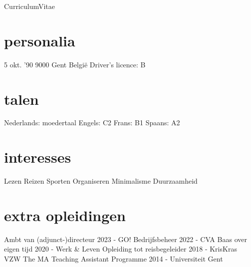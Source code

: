 \documentclass[]{friggeri-cv}
\begin{document}
       {}{Curriculum}{Vitae}
 \begin{aside}
  \vspace{-0.8cm}\section{personalia}
    5 okt. '90
    9000 Gent
    Belgi\"e\vspace{0.21cm}
    \vspace{0.21cm}
    Driver's licence: B \vspace{-1.25mm}
  \section{talen} 	
    Nederlands: moedertaal
    Engels: C2
    Frans:  B1  
    Spaans: A2\vspace{3.3mm}
  \section{interesses}
  Lezen
  Reizen
  Sporten
  Organiseren
  Minimalisme
  Duurzaamheid\vspace{3.3mm}
  \section{extra opleidingen}
  Ambt van (adjunct-)directeur
  {\footnotesize{}2023 - GO!} \vspace{0.25cm}
  Bedrijfsbeheer
  {\footnotesize{}2022 - CVA} \vspace{0.25cm}
  Baas over eigen tijd
  {\footnotesize{}2020 - Werk \& Leven} \vspace{0.25cm}
  Opleiding tot reisbegeleider
  {\footnotesize{}2018 - KrisKras VZW} \vspace{0.25cm}
  The MA Teaching Assistant Programme
  {\footnotesize{}2014 - Universiteit Gent} \vspace{3.3mm}
\end{aside}
\vspace{-1.2cm}
\end{document}
